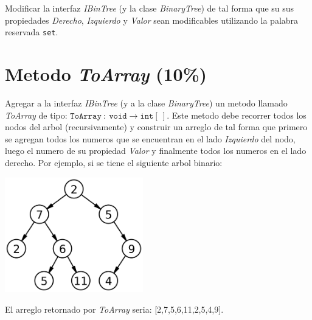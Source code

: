 \documentclass{article}
\newcommand{\perlscript}[2]{
\begin{itemize}
\item[]
\end{itemize}
}
\begin{document}
Modificar la interfaz \emph{IBinTree} (y la clase \emph{BinaryTree}) de tal forma que su sus propiedades \emph{Derecho}, \emph{Izquierdo} y \emph{Valor} sean
modificables utilizando la palabra reservada \texttt{set}.

\section*{Metodo \emph{ToArray} (10\%)}
Agregar a la interfaz \emph{IBinTree} (y a la clase \emph{BinaryTree}) un metodo llamado \emph{ToArray} de
tipo: $\mathtt{ToArray}\ :\ \mathtt{void}\rightarrow \mathtt{int}[\ ]$. Este metodo debe
recorrer todos los nodos del arbol (recursivamente) y construir un arreglo de tal forma
que primero se agregan todos los numeros que se encuentran en el lado \emph{Izquierdo}
del nodo, luego el numero de su propiedad \emph{Valor} y finalmente todos los numeros
en el lado derecho. Por ejemplo, si se tiene el siguiente arbol binario:\\
\begin{center}
\includegraphics[width=6cm]{btree.png}
\end{center}
El arreglo retornado por \emph{ToArray} seria: [2,7,5,6,11,2,5,4,9].
\end{document}
